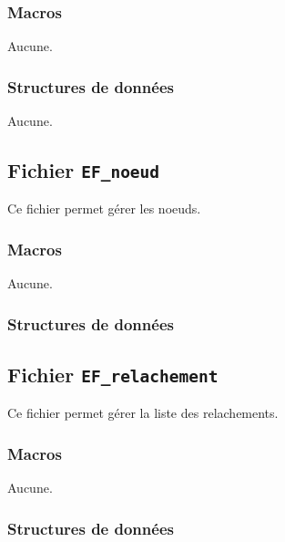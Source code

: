 \documentclass{article}
\begin{document}
\subsubsection{Macros}
Aucune.
\subsubsection{Structures de données}
Aucune.












\subsection{Fichier {\texttt{EF\_noeud}}}
Ce fichier permet gérer les noeuds.
\subsubsection{Macros}
Aucune.
\subsubsection{Structures de données}










\subsection{Fichier {\texttt{EF\_relachement}}}
Ce fichier permet gérer la liste des relachements.
\subsubsection{Macros}
Aucune.
\subsubsection{Structures de données}











\end{document}

